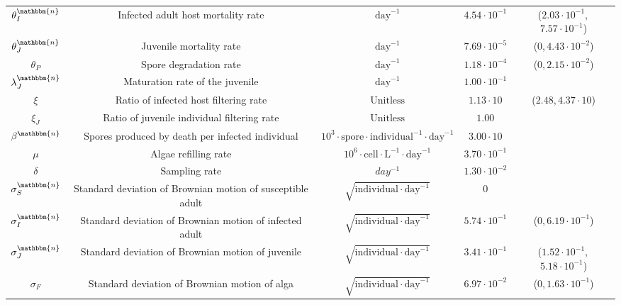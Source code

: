 \documentclass[aoas,preprint]{imsart}\usepackage[]{graphicx}\usepackage[]{xcolor}
\newcommand\native{\mathbbm{n}}
\begin{document}
\begin{table}[H]
{\begin{tabular}{||c|c |c|c|c||}
$\theta^{\native}_{I}$ & Infected adult host mortality rate        &     $  \mathrm{day}^{-1}$     & $4.54\cdot 10^{-1}$  & ($2.03\cdot 10^{-1}$,\,$7.57\cdot 10^{-1}$)\\
$\theta^{\native}_{J}$ & Juvenile mortality rate        &     $ \mathrm{day}^{-1}$     & $7.69\cdot 10^{-5}$  & (0,\,$4.43\cdot 10^{-2}$)\\
$\theta_{P}$   & Spore degradation rate                           &     $ \mathrm{day}^{-1}$     & $1.18\cdot 10^{-4}$   & (0,\,$2.15\cdot 10^{-2}$)\\
$\lambda^{\native}_{J}$ & Maturation rate of the juvenile                  &     $ \mathrm{day}^{-1} $                  & $1.00\cdot 10^{-1}$  & \\
$\xi$           & Ratio of infected host filtering rate       &     $\mathrm{Unitless}$                    & $1.13\cdot 10$         & ($2.48$,\,$4.37\cdot 10$)\\
$\xi_J$         & Ratio of juvenile individual filtering rate &     $\mathrm{Unitless}$                    & $1.00$ & \\
$\beta^{\native}$       & Spores produced by death per infected individual     &  $10^3 \cdot \mathrm{spore} \cdot \mathrm{individual}^{-1} \cdot \mathrm{day}^{-1}$  & $3.00\cdot 10$ & \\
$\mu$           & Algae refilling rate                                &  $10^6 \cdot \mathrm{cell} \cdot \mathrm{L} ^{-1} \cdot \mathrm{day}^{-1}$                 & $3.70\cdot 10^{-1}$ & \\
$\delta$        & Sampling rate                                      &  $day ^{-1}$                                                                         & $1.30\cdot 10^{-2}$ & \\
$\sigma^{\native}_{S}$ & Standard deviation of Brownian motion of susceptible adult         &   $\sqrt{\mathrm{individual} \cdot \mathrm{day}^{-1}}$  & 0  & \\
$\sigma^{\native}_{I}$ & Standard deviation of Brownian motion of infected adult         &   $\sqrt{\mathrm{individual} \cdot \mathrm{day}^{-1}}$  & $5.74\cdot 10^{-1}$  & (0,\,$6.19\cdot 10^{-1}$)\\
$\sigma^{\native}_{J}$ & Standard deviation of Brownian motion of juvenile               &   $\sqrt{\mathrm{individual} \cdot \mathrm{day}^{-1}}$  & $3.41\cdot 10^{-1}$  & ($1.52\cdot 10^{-1}$,\,$5.18\cdot 10^{-1}$)\\
$\sigma_{F}$   & Standard deviation of Brownian motion of alga                          &   $\sqrt{\mathrm{individual} \cdot \mathrm{day}^{-1}}$  & $6.97\cdot 10^{-2}$  & (0,\,$1.63\cdot 10^{-1}$)\\

\end{tabular}}
\end{table}
\end{document}
